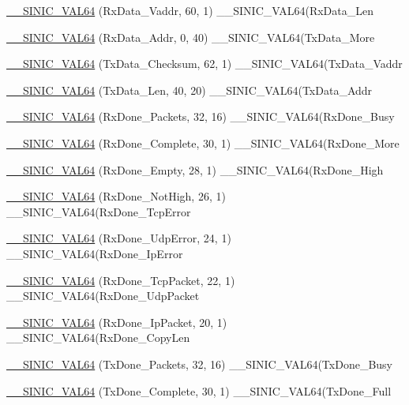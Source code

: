 \begin{DoxyCompactItemize}
\item 
\hyperlink{namespaceSinic_1_1Regs_a7937ce95cf94fb75724a5aa46f980303}{\_\-\_\-SINIC\_\-VAL64} (RxData\_\-Vaddr, 60, 1) \_\-\_\-SINIC\_\-VAL64(RxData\_\-Len
\item 
\hyperlink{namespaceSinic_1_1Regs_a254e210bd0514c52c4201fce02fbde37}{\_\-\_\-SINIC\_\-VAL64} (RxData\_\-Addr, 0, 40) \_\-\_\-SINIC\_\-VAL64(TxData\_\-More
\item 
\hyperlink{namespaceSinic_1_1Regs_a71e5336091cc0a002be6ddca4170f242}{\_\-\_\-SINIC\_\-VAL64} (TxData\_\-Checksum, 62, 1) \_\-\_\-SINIC\_\-VAL64(TxData\_\-Vaddr
\item 
\hyperlink{namespaceSinic_1_1Regs_aec2513afaf1ae9c58b736480c3219f56}{\_\-\_\-SINIC\_\-VAL64} (TxData\_\-Len, 40, 20) \_\-\_\-SINIC\_\-VAL64(TxData\_\-Addr
\item 
\hyperlink{namespaceSinic_1_1Regs_a3bc0e3717e900c96e4f8aace95a88ef0}{\_\-\_\-SINIC\_\-VAL64} (RxDone\_\-Packets, 32, 16) \_\-\_\-SINIC\_\-VAL64(RxDone\_\-Busy
\item 
\hyperlink{namespaceSinic_1_1Regs_ac2d50c9bbacebbb88c7e3ce8f5bfe332}{\_\-\_\-SINIC\_\-VAL64} (RxDone\_\-Complete, 30, 1) \_\-\_\-SINIC\_\-VAL64(RxDone\_\-More
\item 
\hyperlink{namespaceSinic_1_1Regs_aa4d447d12bad07ba3285284641f0b9bd}{\_\-\_\-SINIC\_\-VAL64} (RxDone\_\-Empty, 28, 1) \_\-\_\-SINIC\_\-VAL64(RxDone\_\-High
\item 
\hyperlink{namespaceSinic_1_1Regs_af182b1b9bf70733427ca5de5c279065a}{\_\-\_\-SINIC\_\-VAL64} (RxDone\_\-NotHigh, 26, 1) \_\-\_\-SINIC\_\-VAL64(RxDone\_\-TcpError
\item 
\hyperlink{namespaceSinic_1_1Regs_acd705231133b1770ca6bb2832b91c188}{\_\-\_\-SINIC\_\-VAL64} (RxDone\_\-UdpError, 24, 1) \_\-\_\-SINIC\_\-VAL64(RxDone\_\-IpError
\item 
\hyperlink{namespaceSinic_1_1Regs_a9dfc142d1cf5dd6b3e90c3ce59473f0e}{\_\-\_\-SINIC\_\-VAL64} (RxDone\_\-TcpPacket, 22, 1) \_\-\_\-SINIC\_\-VAL64(RxDone\_\-UdpPacket
\item 
\hyperlink{namespaceSinic_1_1Regs_a644ca1227abc29d02e3bb265b2da3d6a}{\_\-\_\-SINIC\_\-VAL64} (RxDone\_\-IpPacket, 20, 1) \_\-\_\-SINIC\_\-VAL64(RxDone\_\-CopyLen
\item 
\hyperlink{namespaceSinic_1_1Regs_a2471d15988da51d14d87e98543cb61d5}{\_\-\_\-SINIC\_\-VAL64} (TxDone\_\-Packets, 32, 16) \_\-\_\-SINIC\_\-VAL64(TxDone\_\-Busy
\item 
\hyperlink{namespaceSinic_1_1Regs_a9fb08f4dcf913c94b9c8e4d93da6343a}{\_\-\_\-SINIC\_\-VAL64} (TxDone\_\-Complete, 30, 1) \_\-\_\-SINIC\_\-VAL64(TxDone\_\-Full

\end{DoxyCompactItemize}
